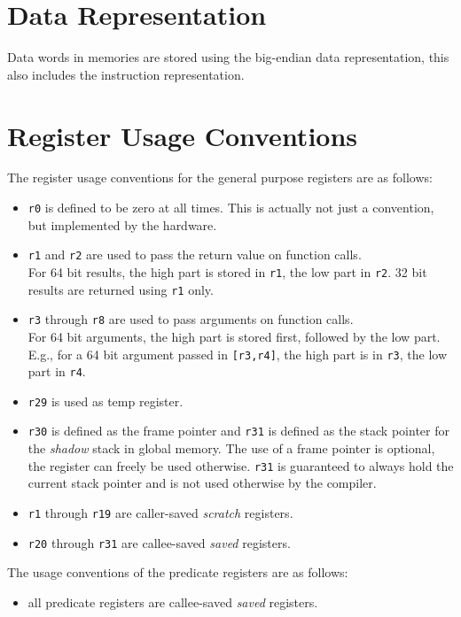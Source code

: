 \section{Data Representation}

Data words in memories are stored using the big-endian data representation, this
also includes the instruction representation.

\section{Register Usage Conventions}

The register usage conventions for the general purpose registers are as follows:
\begin{itemize}
  \item \texttt{r0} is defined to be zero at all times. This is actually not just a convention,
  but implemented by the hardware.
  \item \texttt{r1} and \texttt{r2} are used to pass the return value on
        function calls. \\
        For 64 bit results, the high part is stored in \texttt{r1},
        the low part in \texttt{r2}.
	32 bit results are returned using \texttt{r1} only.
  \item \texttt{r3} through \texttt{r8} are used to pass arguments on function
        calls. \\
        For 64 bit arguments, the high part is stored first,
        followed by the low part.\\ E.g., for a 64 bit argument passed in
        \texttt{[r3,r4]}, the high part is in \texttt{r3}, the low part
        in \texttt{r4}.
  \item \texttt{r29} is used as temp register.
  \item \texttt{r30} is defined as the frame pointer and
        \texttt{r31} is defined as the stack pointer for the \emph{shadow}
        stack in global memory.
        The use of a frame pointer is optional, the register can freely be
        used otherwise.
	\texttt{r31} is guaranteed to always hold the current stack pointer and
        is not used otherwise by the compiler.
  \item \texttt{r1} through \texttt{r19} are caller-saved \emph{scratch}
        registers.
  \item \texttt{r20} through \texttt{r31} are callee-saved \emph{saved}
        registers.
\end{itemize}

The usage conventions of the predicate registers are as follows:
\begin{itemize}
  \item all predicate registers are callee-saved \emph{saved} registers.
\end{itemize}


